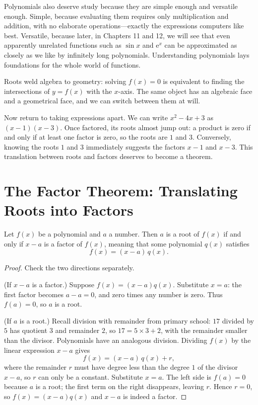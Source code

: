 Polynomials also deserve study because they are simple enough and versatile enough. Simple, because evaluating them requires only multiplication and addition, with no elaborate operations---exactly the expressions computers like best. Versatile, because later, in Chapters 11 and 12, we will see that even apparently unrelated functions such as $\sin x$ and $\mathrm{e}^x$ can be approximated as closely as we like by infinitely long polynomials. Understanding polynomials lays foundations for the whole world of functions.

Roots weld algebra to geometry: solving $f(x)=0$ is equivalent to finding the intersections of $y=f(x)$ with the $x$-axis. The same object has an algebraic face and a geometrical face, and we can switch between them at will.

Now return to taking expressions apart. We can write $x^2-4x+3$ as $(x-1)(x-3)$. Once factored, its roots almost jump out: a product is zero if and only if at least one factor is zero, so the roots are $1$ and $3$. Conversely, knowing the roots $1$ and $3$ immediately suggests the factors $x-1$ and $x-3$. This translation between roots and factors deserves to become a theorem.

\section{The Factor Theorem: Translating Roots into Factors}

\begin{dingli}
Let $f(x)$ be a polynomial and $a$ a number. Then $a$ is a root of $f(x)$ if and only if $x-a$ is a factor of $f(x)$, meaning that some polynomial $q(x)$ satisfies
\[
f(x) = (x-a)\,q(x).
\]
\end{dingli}

\begin{proof}
Check the two directions separately.

(If $x-a$ is a factor.) Suppose $f(x)=(x-a)q(x)$. Substitute $x=a$: the first factor becomes $a-a=0$, and zero times any number is zero. Thus $f(a)=0$, so $a$ is a root.

(If $a$ is a root.) Recall division with remainder from primary school: $17$ divided by $5$ has quotient $3$ and remainder $2$, so $17 = 5\times 3 + 2$, with the remainder smaller than the divisor. Polynomials have an analogous division. Dividing $f(x)$ by the linear expression $x-a$ gives
\[
f(x) = (x-a)\,q(x) + r,
\]
where the remainder $r$ must have degree less than the degree $1$ of the divisor $x-a$, so $r$ can only be a constant. Substitute $x=a$. The left side is $f(a)=0$ because $a$ is a root; the first term on the right disappears, leaving $r$. Hence $r=0$, so $f(x) = (x-a)q(x)$ and $x-a$ is indeed a factor.
\end{proof}

